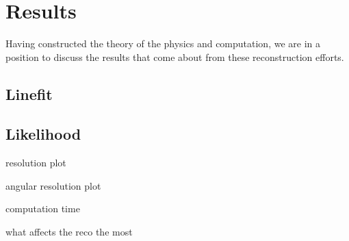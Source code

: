 \chapter{Results}
Having constructed the theory of the physics and computation, we are in a position to discuss the results that come about from these reconstruction efforts. 

\section{Linefit}



\section{Likelihood}

resolution plot

angular resolution plot

computation time

what affects the reco the most


